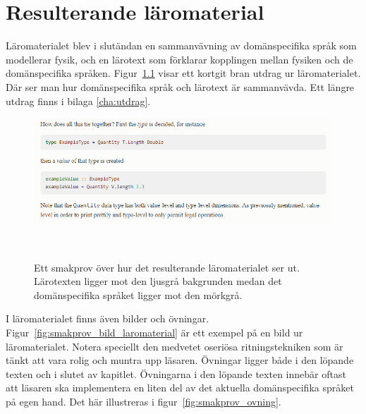 
\chapter{Resulterande läromaterial}

\begin{draft}

Läromaterialet blev i slutändan en sammanvävning av domänspecifika språk som
modellerar fysik, och en lärotext som förklarar kopplingen mellan fysiken och de
domänspecifika språken. Figur~\ref{fig:smakprov_laromaterial} visar ett kortgit bran
utdrag ur läromaterialet. Där ser man hur domänspecifika språk och lärotext är
sammanvävda. Ett längre utdrag finns i bilaga \ref{cha:utdrag}.

\begin{figure}[tph]
  \includegraphics[width=\linewidth]{figure/smakprov_laromaterial.png}
  \caption{Ett smakprov över hur det resulterande läromaterialet ser ut.
           Lärotexten ligger mot den ljusgrå bakgrunden medan det
           domänspecifika språket ligger mot den
           mörkgrå.}~\label{fig:smakprov_laromaterial} 
\end{figure}

I läromaterialet finns även bilder och övningar. Figur~\ref{fig:smakprov_bild_laromaterial} är ett exempel på en bild ur läromaterialet. Notera speciellt den medvetet oseriösa ritningstekniken som är tänkt att vara rolig och muntra upp läsaren. Övningar ligger både i den löpande texten och i slutet av kapitlet. Övningarna i den löpande texten innebär oftast att läsaren ska implementera en liten del av det aktuella domänspecifika språket på egen hand. Det här illustreras i figur~\ref{fig:smakprov_ovning}.


\end{draft}
